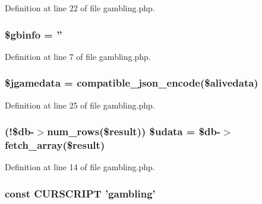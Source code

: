 Definition at line 22 of file gambling.\+php.

\hypertarget{gambling_8php_aff66699e41c92bfb3392dcbac1092392}{
\subsubsection[{\$gbinfo}]{\setlength{\rightskip}{0pt plus 5cm}\$gbinfo = ''}}\label{gambling_8php_aff66699e41c92bfb3392dcbac1092392}


Definition at line 7 of file gambling.\+php.

\hypertarget{gambling_8php_ad8ad32ee4a34333c6c5c5b4379a80cf2}{
\subsubsection[{\$jgamedata}]{\setlength{\rightskip}{0pt plus 5cm}\$jgamedata = {\bf compatible\+\_\+json\+\_\+encode}(\$alivedata)}}\label{gambling_8php_ad8ad32ee4a34333c6c5c5b4379a80cf2}


Definition at line 25 of file gambling.\+php.

\hypertarget{gambling_8php_aa64a6e7c321a5fc5c5089fc201f285cb}{
\subsubsection[{\$udata}]{ (!\$db-\/$>$num\+\_\+rows(\${\bf result})) \$udata = \$db-\/$>$fetch\+\_\+array(\${\bf result})}}\label{gambling_8php_aa64a6e7c321a5fc5c5089fc201f285cb}


Definition at line 14 of file gambling.\+php.

\hypertarget{gambling_8php_a39c39f525eceb86cabc338804f230e80}{
\subsubsection[{C\+U\+R\+S\+C\+R\+I\+P\+T}]{\setlength{\rightskip}{0pt plus 5cm}const C\+U\+R\+S\+C\+R\+I\+P\+T 'gambling'}}\label{gambling_8php_a39c39f525eceb86cabc338804f230e80}


